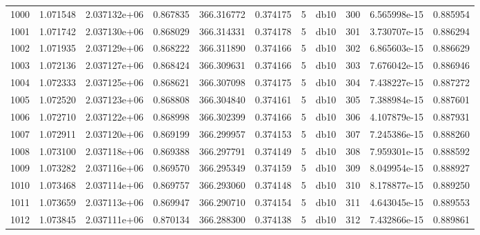 \begin{tabular}{lrrrrrrlrrr}
1000 &    1.071548 &        2.037132e+06 &  0.867835 &              366.316772 &    0.374175 &       5 &         db10 &    300 &   6.565998e-15 &      0.885954 \\
1001 &    1.071742 &        2.037130e+06 &  0.868029 &              366.314331 &    0.374178 &       5 &         db10 &    301 &   3.730707e-15 &      0.886294 \\
1002 &    1.071935 &        2.037129e+06 &  0.868222 &              366.311890 &    0.374166 &       5 &         db10 &    302 &   6.865603e-15 &      0.886629 \\
1003 &    1.072136 &        2.037127e+06 &  0.868424 &              366.309631 &    0.374166 &       5 &         db10 &    303 &   7.676042e-15 &      0.886946 \\
1004 &    1.072333 &        2.037125e+06 &  0.868621 &              366.307098 &    0.374175 &       5 &         db10 &    304 &   7.438227e-15 &      0.887272 \\
1005 &    1.072520 &        2.037123e+06 &  0.868808 &              366.304840 &    0.374161 &       5 &         db10 &    305 &   7.388984e-15 &      0.887601 \\
1006 &    1.072710 &        2.037122e+06 &  0.868998 &              366.302399 &    0.374166 &       5 &         db10 &    306 &   4.107879e-15 &      0.887931 \\
1007 &    1.072911 &        2.037120e+06 &  0.869199 &              366.299957 &    0.374153 &       5 &         db10 &    307 &   7.245386e-15 &      0.888260 \\
1008 &    1.073100 &        2.037118e+06 &  0.869388 &              366.297791 &    0.374149 &       5 &         db10 &    308 &   7.959301e-15 &      0.888592 \\
1009 &    1.073282 &        2.037116e+06 &  0.869570 &              366.295349 &    0.374159 &       5 &         db10 &    309 &   8.049954e-15 &      0.888927 \\
1010 &    1.073468 &        2.037114e+06 &  0.869757 &              366.293060 &    0.374148 &       5 &         db10 &    310 &   8.178877e-15 &      0.889250 \\
1011 &    1.073659 &        2.037113e+06 &  0.869947 &              366.290710 &    0.374154 &       5 &         db10 &    311 &   4.643045e-15 &      0.889553 \\
1012 &    1.073845 &        2.037111e+06 &  0.870134 &              366.288300 &    0.374138 &       5 &         db10 &    312 &   7.432866e-15 &      0.889861 \\

\end{tabular}

